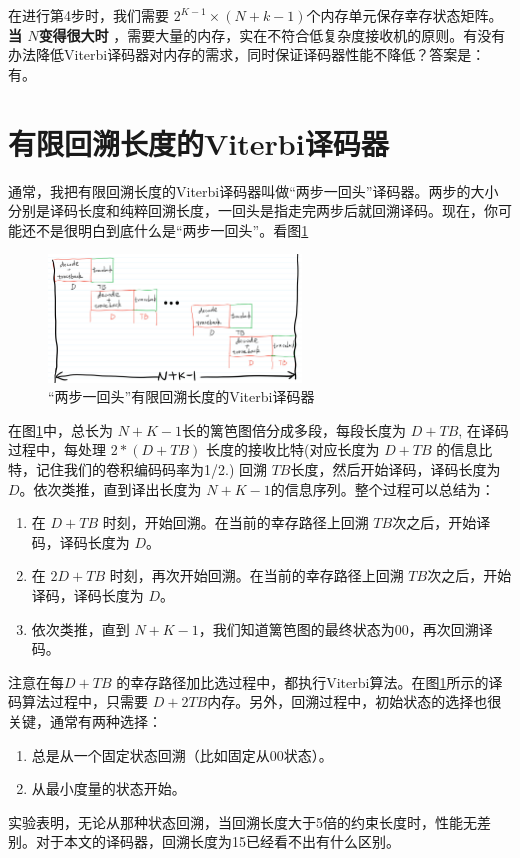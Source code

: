 \documentclass[10pt,a4paper,UTF8]{article}
\begin{document}
在进行第4步时，我们需要 \(2^{K-1}\times (N+k-1)\)个内存单元保存幸存状态矩阵。 \textbf{当 \(N\)变得很大时} ，需要大量的内存，实在不符合低复杂度接收机的原则。有没有办法降低Viterbi译码器对内存的需求，同时保证译码器性能不降低？答案是：有。

\section{有限回溯长度的Viterbi译码器}
\label{sec:orgheadline3}


通常，我把有限回溯长度的Viterbi译码器叫做“两步一回头”译码器。两步的大小分别是译码长度和纯粹回溯长度，一回头是指走完两步后就回溯译码。现在，你可能还不是很明白到底什么是“两步一回头”。看图\ref{fig:orgparagraph1}

\begin{figure}[htb]
\centering
\includegraphics[width=0.6\textwidth]{../../img/20160117ViterbiFiniteTracebackLength.jpg}
\caption{\label{fig:orgparagraph1}
“两步一回头”有限回溯长度的Viterbi译码器}
\end{figure}

在图\ref{fig:orgparagraph1}中，总长为 \(N+K-1\)长的篱笆图倍分成多段，每段长度为 \(D+TB\), 在译码过程中，每处理 \(2*(D+TB)\) 长度的接收比特(对应长度为  \(D+TB\) 的信息比特，记住我们的卷积编码码率为1/2.) 回溯 \(TB\)长度，然后开始译码，译码长度为 \(D\)。依次类推，直到译出长度为 \(N+K-1\)的信息序列。整个过程可以总结为：

\begin{enumerate}
\item 在 \(D+TB\) 时刻，开始回溯。在当前的幸存路径上回溯 \(TB\)次之后，开始译码，译码长度为 \(D\)。
\item 在 \(2D+TB\) 时刻，再次开始回溯。在当前的幸存路径上回溯 \(TB\)次之后，开始译码，译码长度为 \(D\)。
\item 依次类推，直到 \(N+K-1\)，我们知道篱笆图的最终状态为00，再次回溯译码。
\end{enumerate}

注意在每\(D+TB\) 的幸存路径加比选过程中，都执行Viterbi算法。在图\ref{fig:orgparagraph1}所示的译码算法过程中，只需要 \(D+2TB\)内存。另外，回溯过程中，初始状态的选择也很关键，通常有两种选择：

\begin{enumerate}
\item 总是从一个固定状态回溯（比如固定从00状态）。
\item 从最小度量的状态开始。
\end{enumerate}

实验表明，无论从那种状态回溯，当回溯长度大于5倍的约束长度时，性能无差别。对于本文的译码器，回溯长度为15已经看不出有什么区别。
\end{document}
